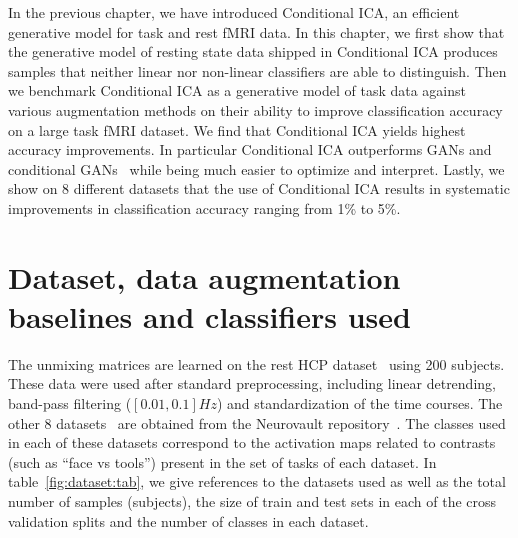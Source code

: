 In the previous chapter, we have introduced Conditional ICA, an efficient generative
model for task and rest fMRI data.
In this chapter, we first show that the generative model of resting state data shipped in Conditional ICA produces samples that neither linear nor non-linear classifiers are able to distinguish.
% 
Then we benchmark Conditional ICA as a generative model of task data against
various augmentation methods  on their
ability to improve classification accuracy on a large task fMRI dataset.
We find that Conditional ICA yields highest accuracy improvements.
In particular Conditional ICA outperforms GANs and conditional GANs~\cite{mirza2014conditional} while being much easier to optimize and interpret. 
Lastly, we show on 8 different datasets that the use of Conditional ICA results in systematic improvements in classification accuracy ranging from 1\% to 5\%.

\section{Dataset, data augmentation baselines and classifiers used}
\label{sec:condica:datasets}
The unmixing matrices are learned on the rest HCP
dataset~\cite{van2013wu} using 200 subjects.
These data were used after standard
preprocessing, including linear detrending, band-pass filtering
($[0.01, 0.1]Hz$) and standardization of the time courses.
The other 8 datasets~\cite{van2013wu, shafto2014cambridge,
  orfanos2017brainomics, pinel2019functional, pinel2007fast, pinel2013genetic,
  poldrack2016phenome, pinel2013genetic} are obtained from the Neurovault repository~\cite{gorgolewski2015neurovault}.
The classes used in each of these datasets correspond to the activation maps
related to contrasts (such as ``face vs tools'')
present in the set of tasks of each dataset. In table~\ref{fig:dataset:tab}, we
give references to the datasets used as well as the total number of samples
(subjects), the size of train and test sets in each of the cross validation
splits and the number of classes in each dataset. 

